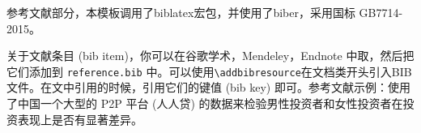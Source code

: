 参考文献部分，本模板调用了biblatex宏包，并使用了biber，采用国标 GB7714-2015。

关于文献条目 (bib item)，你可以在谷歌学术，Mendeley，Endnote 中取，然后把它们添加到 \texttt{reference.bib} 中。可以使用\texttt{\textbackslash addbibresource}在文档类开头引入BIB文件。在文中引用的时候，引用它们的键值 (bib key) 即可。参考文献示例：\cite{cn1,en2,en3}使用了中国一个大型的 P2P 平台 (人人贷) 的数据来检验男性投资者和女性投资者在投资表现上是否有显著差异。